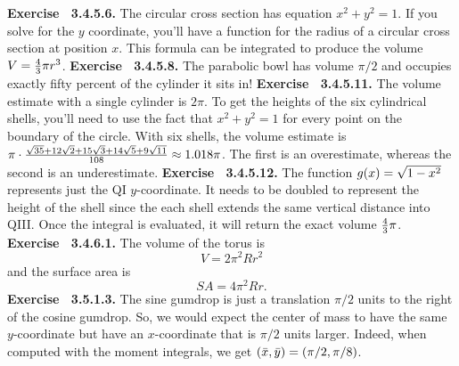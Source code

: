  {\noindent \protect \bf  Exercise ~3.4.5.6.} The circular cross section has equation $x^2+y^2=1$. If you solve for the $y$ coordinate, you'll have a function for the radius of a circular cross section at position $x$. This formula can be integrated to produce the volume $V=\protect \frac  {4}{3}\pi r^3$. \protect \newline  \protect \newline  
 {\noindent \protect \bf  Exercise ~3.4.5.8.} The parabolic bowl has volume $\pi /2$ and occupies exactly fifty percent of the cylinder it sits in! \protect \newline  \protect \newline  
 {\noindent \protect \bf  Exercise ~3.4.5.11.} The volume estimate with a single cylinder is $2\pi $. To get the heights of the six cylindrical shells, you'll need to use the fact that $x^2+y^2=1$ for every point on the boundary of the circle. With six shells, the volume estimate is $\pi \cdot \protect \frac  {\protect \sqrt  {35} + 12 \protect \sqrt  {2} + 15 \protect \sqrt  {3} + 14 \protect \sqrt  {5} + 9 \protect \sqrt  {11}}{108}\approx 1.018\pi $. The first is an overestimate, whereas the second is an underestimate. \protect \newline  \protect \newline  
 {\noindent \protect \bf  Exercise ~3.4.5.12.} The function $g(x)=\protect \sqrt  {1-x^2}$ represents just the QI $y$-coordinate. It needs to be doubled to represent the height of the shell since the each shell extends the same vertical distance into QIII. Once the integral is evaluated, it will return the exact volume $\protect \frac  {4}{3}\pi $. \protect \newline  \protect \newline  
 {\noindent \protect \bf  Exercise ~3.4.6.1.} The volume of the torus is $$V=2\pi ^2Rr^2 $$ and the surface area is $$SA=4\pi ^2Rr. $$ \protect \newline  \protect \newline  
 {\noindent \protect \bf  Exercise ~3.5.1.3.} The sine gumdrop is just a translation $\pi /2$ units to the right of the cosine gumdrop. So, we would expect the center of mass to have the same $y$-coordinate but have an $x$-coordinate that is $\pi /2$ units larger. Indeed, when computed with the moment integrals, we get $\left (\protect \mathaccentV {bar}016{x},\protect \mathaccentV {bar}016{y}\right )=\left (\pi /2,\pi /8\right )$.  \protect \newline  \protect \newline  
